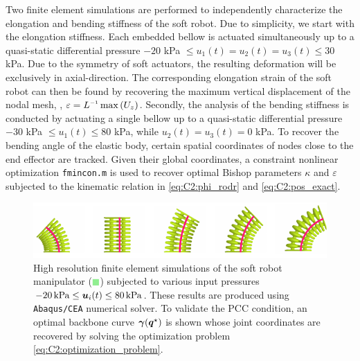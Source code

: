 Two finite element simulations are performed to {independently characterize the elongation and bending stiffness of the soft robot. Due to simplicity, we start with the elongation stiffness}. Each embedded bellow is actuated simultaneously up to a quasi-static differential pressure $-20$ kPa $\le u_1(t) = u_2(t) = u_3(t) \le 30$ kPa. Due to the symmetry of soft actuators, the resulting deformation will be exclusively in axial-direction. The corresponding elongation strain of the soft robot can then be found by recovering the maximum vertical displacement of the nodal mesh, \ie, $\varepsilon = L\inv\max \left( {U}_z \right)$. Secondly, the analysis of the bending stiffness is conducted by actuating a single bellow up to a quasi-static differential pressure $-30$ kPa $\le u_1(t) \le  80$ kPa, while $u_2(t) = u_3(t) = 0$ kPa. To recover the bending angle of the elastic body, certain spatial coordinates of nodes close to the end effector are tracked. Given their global coordinates, a constraint nonlinear optimization \texttt{fmincon.m} is used to recover optimal Bishop parameters $\kappa$ and $\varepsilon
$ subjected to the kinematic relation in \eqref{eq:C2:phi_rodr} and \eqref{eq:C2:pos_exact}.
%
\begin{figure}[!t]
  \centering
  \includegraphics*{./pdf/thesis-figure-4-6.pdf}
  \vspace{-0.2cm}
  \caption{\small High resolution finite element simulations of the soft robot manipulator (\textcolor{lightgreen}{$\blacksquare$}) subjected to various input pressures $-20 \,\si{\kilo \pascal} \le {\boldsymbol{u}}_i(t) \le 80 \,\si{\kilo \pascal}$.  These results are produced using \texttt{Abaqus/CEA} numerical solver.  To validate the PCC condition, an optimal backbone curve ${\boldsymbol{\gamma}}({\boldsymbol{q}}^\star)$ is shown  whose joint coordinates are recovered by solving the optimization problem \eqref{eq:C2:optimization_problem}.}
  \vspace{-0.1cm}
  \label{fig:C2:fem_analysis}
\end{figure}
%
